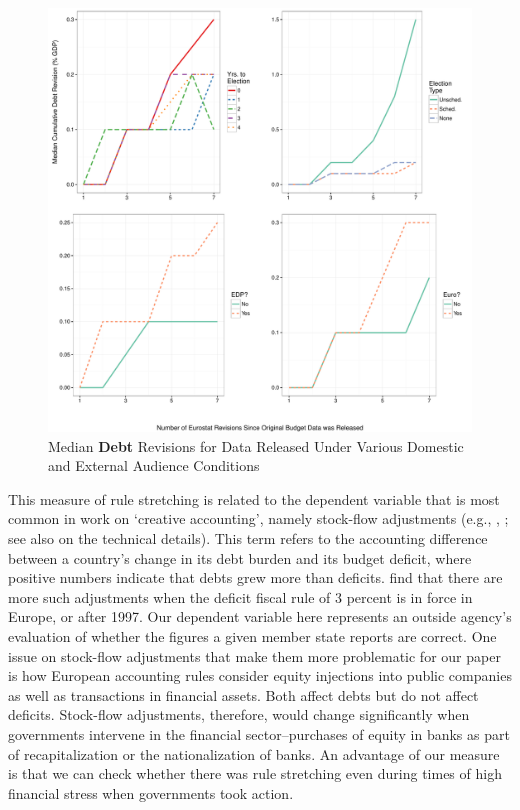 \documentclass[]{article}
\begin{document}
\begin{figure}
    \begin{center}
        \caption{Median \textbf{Debt} Revisions for Data Released Under Various Domestic and External Audience Conditions}
        \label{median_debt_revisions}
        \includegraphics[scale=0.55]{figures/median_debt_revisions.pdf}
    \end{center}
\end{figure}

This measure of rule stretching is related to the dependent variable that is most common in work on `creative accounting', namely stock-flow adjustments (e.g., \citealt{vonHagenWolff2006}, \citealt{Alt2014}; see also \citealt{Seiferling2013} on the technical details).  This term refers to the accounting difference between a country's change in its debt burden and its budget deficit, where positive numbers indicate that debts grew more than deficits.  \cite{vonHagenWolff2006} find that there are more such adjustments when the deficit fiscal rule of 3 percent is in force in Europe, or after 1997.  Our dependent variable here represents an outside agency's evaluation of whether the figures a given member state reports are correct.  One issue on stock-flow adjustments that make them more problematic for our paper is how European accounting rules consider equity injections into public companies as well as transactions in financial assets. Both affect debts but do not affect deficits. Stock-flow adjustments, therefore, would change significantly when governments intervene in the financial sector--purchases of equity in banks as part of recapitalization or the nationalization of banks.  An advantage of our measure is that we can check whether there was rule stretching even during times of high financial stress when governments took action.
\end{document}
